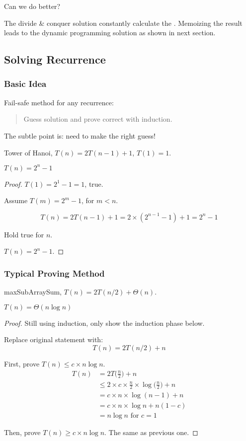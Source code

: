 Can we do better?

The divide \& conquer solution constantly calculate the .
Memoizing the result leads to the dynamic programming solution as shown in next section.

\subsection{Solving Recurrence}
\subsubsection{Basic Idea}

Fail-safe method for any recurrence:
\begin{quote}
    Guess solution and prove correct with induction.
\end{quote}
The subtle point is: need to make the right guess!

\AlgoExample  Tower of Hanoi, $T(n) = 2T(n-1) + 1$, $T(1) = 1$.

\Claim $T(n) = 2^n -1$

\begin{proof}

    \BaseCase $T(1) = 2^1 -1 = 1$, true.

    \InductionStep Assume $T(m) = 2^m - 1$, for $m < n$.

    \[T(n) = 2T(n-1) + 1 = 2\times (2^{n-1} -1) + 1 = 2^n - 1\]

    Hold true for $n$.

    \InductionConclusion $T(n) = 2^n - 1$.
\end{proof}

\subsubsection{Typical Proving Method}
\AlgoExample maxSubArraySum, $T(n) = 2T(n/2) + \Theta(n)$.

\Claim $T(n) = \Theta(n \log n)$

\begin{proof}
    Still using induction, only show the induction phase below.

    Replace original statement with:
    \[T(n) = 2T(n/2) + n\]

    First, prove $T(n) \leq c \times n \log n$.
    \begin{align*}
        T(n) &= 2T\big(\frac{n}{2}\big) + n \\
             &\leq 2\times c \times \frac{n}{2} \times \log\big(\frac{n}{2}\big) + n \\
             &= c \times n \times \log(n-1) + n \\
             &= c \times n \times \log n + n(1-c) \\
             &= n\log n \text{ for } c = 1
    \end{align*}

    Then, prove $T(n) \geq c \times n \log n$. The same as previous one.
\end{proof}

